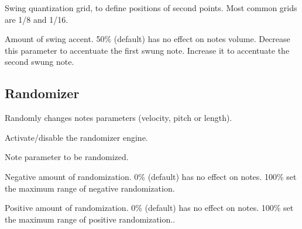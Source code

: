   \settingopt{\ldots} 

Swing quantization grid, to define positions of second points. Most common grids are 1/8 and 1/16.

  \settingopt{\ldots} 

Amount of swing accent. 50\% (default) has no effect on notes volume. Decrease this parameter to accentuate the first swung note. Increase it to accentuate the second swung note.

\subsection{Randomizer}

Randomly changes notes parameters (velocity, pitch or length).


  

Activate/disable the randomizer engine.

    

Note parameter to be randomized.

  \settingopt{\ldots} 

Negative amount of randomization. 0\% (default) has no effect on notes. 100\% set the maximum range of negative randomization.

  \settingopt{\ldots} 

Positive amount of randomization. 0\% (default) has no effect on notes. 100\% set the maximum range of positive randomization..
